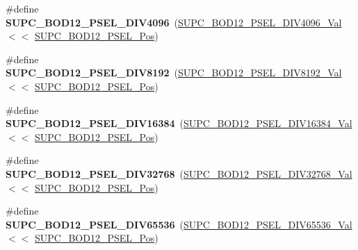 \begin{DoxyCompactItemize}
\item 
\hypertarget{group___s_a_m_l21___s_u_p_c_gac6d17779b6885511693237e47a0d0200}{}\#define {\bfseries S\+U\+P\+C\+\_\+\+B\+O\+D12\+\_\+\+P\+S\+E\+L\+\_\+\+D\+I\+V4096}~(\hyperlink{group___s_a_m_l21___s_u_p_c_ga95bb22e3951ddd6c60341e886564498d}{S\+U\+P\+C\+\_\+\+B\+O\+D12\+\_\+\+P\+S\+E\+L\+\_\+\+D\+I\+V4096\+\_\+\+Val}   $<$$<$ \hyperlink{group___s_a_m_l21___s_u_p_c_ga43d50cdce3fb9ed37bfc9007dccac0d2}{S\+U\+P\+C\+\_\+\+B\+O\+D12\+\_\+\+P\+S\+E\+L\+\_\+\+Pos})\label{group___s_a_m_l21___s_u_p_c_gac6d17779b6885511693237e47a0d0200}

\item 
\hypertarget{group___s_a_m_l21___s_u_p_c_ga3a4a0b05b184b788a3b9546101355b03}{}\#define {\bfseries S\+U\+P\+C\+\_\+\+B\+O\+D12\+\_\+\+P\+S\+E\+L\+\_\+\+D\+I\+V8192}~(\hyperlink{group___s_a_m_l21___s_u_p_c_gae1438499c916fa315ae4f052037816c0}{S\+U\+P\+C\+\_\+\+B\+O\+D12\+\_\+\+P\+S\+E\+L\+\_\+\+D\+I\+V8192\+\_\+\+Val}   $<$$<$ \hyperlink{group___s_a_m_l21___s_u_p_c_ga43d50cdce3fb9ed37bfc9007dccac0d2}{S\+U\+P\+C\+\_\+\+B\+O\+D12\+\_\+\+P\+S\+E\+L\+\_\+\+Pos})\label{group___s_a_m_l21___s_u_p_c_ga3a4a0b05b184b788a3b9546101355b03}

\item 
\hypertarget{group___s_a_m_l21___s_u_p_c_ga9a0f02f24ec0acbe4f574a1f420085a2}{}\#define {\bfseries S\+U\+P\+C\+\_\+\+B\+O\+D12\+\_\+\+P\+S\+E\+L\+\_\+\+D\+I\+V16384}~(\hyperlink{group___s_a_m_l21___s_u_p_c_gabebe1d1c5049dd5ccb17409ee23f3230}{S\+U\+P\+C\+\_\+\+B\+O\+D12\+\_\+\+P\+S\+E\+L\+\_\+\+D\+I\+V16384\+\_\+\+Val}  $<$$<$ \hyperlink{group___s_a_m_l21___s_u_p_c_ga43d50cdce3fb9ed37bfc9007dccac0d2}{S\+U\+P\+C\+\_\+\+B\+O\+D12\+\_\+\+P\+S\+E\+L\+\_\+\+Pos})\label{group___s_a_m_l21___s_u_p_c_ga9a0f02f24ec0acbe4f574a1f420085a2}

\item 
\hypertarget{group___s_a_m_l21___s_u_p_c_ga354b5f8a2d72d00ec691a6a12082561b}{}\#define {\bfseries S\+U\+P\+C\+\_\+\+B\+O\+D12\+\_\+\+P\+S\+E\+L\+\_\+\+D\+I\+V32768}~(\hyperlink{group___s_a_m_l21___s_u_p_c_ga38dccf3e9461788a2c3387858c502de4}{S\+U\+P\+C\+\_\+\+B\+O\+D12\+\_\+\+P\+S\+E\+L\+\_\+\+D\+I\+V32768\+\_\+\+Val}  $<$$<$ \hyperlink{group___s_a_m_l21___s_u_p_c_ga43d50cdce3fb9ed37bfc9007dccac0d2}{S\+U\+P\+C\+\_\+\+B\+O\+D12\+\_\+\+P\+S\+E\+L\+\_\+\+Pos})\label{group___s_a_m_l21___s_u_p_c_ga354b5f8a2d72d00ec691a6a12082561b}

\item 
\hypertarget{group___s_a_m_l21___s_u_p_c_ga293e4f6b25789ee5d9c56c3e00687a2d}{}\#define {\bfseries S\+U\+P\+C\+\_\+\+B\+O\+D12\+\_\+\+P\+S\+E\+L\+\_\+\+D\+I\+V65536}~(\hyperlink{group___s_a_m_l21___s_u_p_c_ga51e557537f1fed24f892ba21371cb8bc}{S\+U\+P\+C\+\_\+\+B\+O\+D12\+\_\+\+P\+S\+E\+L\+\_\+\+D\+I\+V65536\+\_\+\+Val}  $<$$<$ \hyperlink{group___s_a_m_l21___s_u_p_c_ga43d50cdce3fb9ed37bfc9007dccac0d2}{S\+U\+P\+C\+\_\+\+B\+O\+D12\+\_\+\+P\+S\+E\+L\+\_\+\+Pos})\label{group___s_a_m_l21___s_u_p_c_ga293e4f6b25789ee5d9c56c3e00687a2d}


\end{DoxyCompactItemize}
